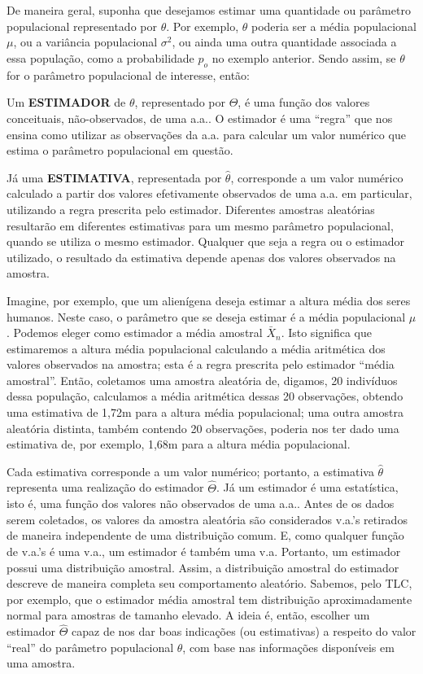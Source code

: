 \documentclass[
]{book}
\theoremstyle{definition}
\theoremstyle{definition}
\theoremstyle{definition}
\theoremstyle{remark}
\begin{document}
De maneira geral, suponha que desejamos estimar uma quantidade ou parâmetro populacional representado por \(\theta\). Por exemplo, \(\theta\) poderia ser a média populacional \(\mu\), ou a variância populacional \(\sigma^2\), ou ainda uma outra quantidade associada a essa população, como a probabilidade \(p_o\) no exemplo anterior. Sendo assim, se \(\theta\) for o parâmetro populacional de interesse, então:

Um \textbf{ESTIMADOR} de \(\theta\), representado por \(\hat\Theta\), é uma função dos valores conceituais, não-observados, de uma a.a.. O estimador é uma ``regra'' que nos ensina como utilizar as observações da a.a. para calcular um valor numérico que estima o parâmetro populacional em questão.

Já uma \textbf{ESTIMATIVA}, representada por \(\hat\theta\), corresponde a um valor numérico calculado a partir dos valores efetivamente observados de uma a.a. em particular, utilizando a regra prescrita pelo estimador. Diferentes amostras aleatórias resultarão em diferentes estimativas para um mesmo parâmetro populacional, quando se utiliza o mesmo estimador. Qualquer que seja a regra ou o estimador utilizado, o resultado da estimativa depende apenas dos valores observados na amostra.

Imagine, por exemplo, que um alienígena deseja estimar a altura média dos seres humanos. Neste caso, o parâmetro que se deseja estimar é a média populacional \(\mu\). Podemos eleger como estimador a média amostral \(\bar{X}_n\). Isto significa que estimaremos a altura média populacional calculando a média aritmética dos valores observados na amostra; esta é a regra prescrita pelo estimador ``média amostral''. Então, coletamos uma amostra aleatória de, digamos, 20 indivíduos dessa população, calculamos a média aritmética dessas 20 observações, obtendo uma estimativa de 1,72m para a altura média populacional; uma outra amostra aleatória distinta, também contendo 20 observações, poderia nos ter dado uma estimativa de, por exemplo, 1,68m para a altura média populacional.

Cada estimativa corresponde a um valor numérico; portanto, a estimativa \(\hat\theta\) representa uma realização do estimador \(\hat\Theta\). Já um estimador é uma estatística, isto é, uma função dos valores não observados de uma a.a.. Antes de os dados serem coletados, os valores da amostra aleatória são considerados v.a.'s retirados de maneira independente de uma distribuição comum. E, como qualquer função de v.a.'s é uma v.a., um estimador é também uma v.a. Portanto, um estimador possui uma distribuição amostral. Assim, a distribuição amostral do estimador descreve de maneira completa seu comportamento aleatório. Sabemos, pelo TLC, por exemplo, que o estimador média amostral tem distribuição aproximadamente normal para amostras de tamanho elevado. A ideia é, então, escolher um estimador \(\hat\Theta\) capaz de nos dar boas indicações (ou estimativas) a respeito do valor ``real'' do parâmetro populacional \(\theta\), com base nas informações disponíveis em uma amostra.
\end{document}
